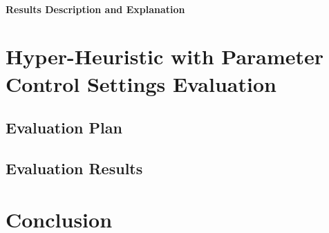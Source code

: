 \paragraph{Results Description and Explanation}





\section{Hyper-Heuristic with Parameter Control Settings Evaluation}\label{eval: hh-pc}
\subsection{Evaluation Plan}\label{eval: hh-pc plan}
\subsection{Evaluation Results}\label{eval: hh-pc results}



\section{Conclusion}\label{eval: conclution}
